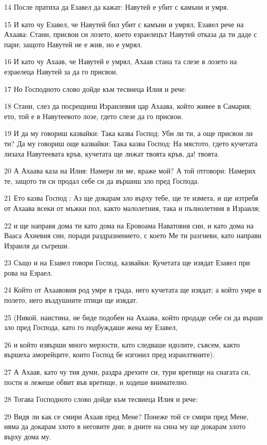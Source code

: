 \par 14 После пратиха да Езавел да кажат: Навутей е убит с камъни и умря.
\par 15 И като чу Езавел, че Навутей бил убит с камъни и умрял, Езавел рече на Ахаава: Стани, присвои си лозето, което езраелецът Навутей отказа да ти даде с пари; защото Навутей не е жив, но е умрял.
\par 16 И като чу Ахаав, че Навутей е умрял, Ахаав стана та слезе в лозето на езраелеца Навутей за да го присвои.
\par 17 Но Господното слово дойде към тесвиеца Илия и рече:
\par 18 Стани, слез да посрещнеш Израилевия цар Ахаава, който живее в Самария; ето, той е в Навутеевото лозе, гдето слезе да го присвои.
\par 19 И да му говориш казвайки: Така казва Господ: Уби ли ти, а още присвои ли ти? Да му говориш още казвайки: Така казва Господ: На мястото, гдето кучетата лизаха Навутеевата кръв, кучетата ще лижат твоята кръв, да! твоята.
\par 20 А Ахаава каза на Илия: Намери ли ме, враже мой? А той отговори: Намерих те, защото ти си продал себе си да вършиш зло пред Господа.
\par 21 Ето казва Господ : Аз ще докарам зло върху тебе, ще те измета, и ще изтребя от Ахаава всеки от мъжки пол, както малолетния, така и пълнолетния в Израиля;
\par 22 и ще направя дома ти като дома на Еровоама Наватовия син, и като дома на Вааса Ахиевия син, поради раздразнението, с което Ме ти разгневи, като направи Израиля да съгреши.
\par 23 Също и на Езавел говори Господ, казвайки: Кучетата ще изядат Езавел при рова на Езраел.
\par 24 Който от Ахаавовия род умре в града, него кучетата ще изядат; а който умре в полето, него въздушните птици ще изядат.
\par 25 (Никой, наистина, не биде подобен на Ахаава, който продаде себе си да върши зло пред Господа, като го подбуждаше жена му Езавел,
\par 26 и който извърши много мерзости, като следваше идолите, съвсем, както вършеха аморейците, които Господ бе изгонил пред израилтяните).
\par 27 А Ахаав, като чу тия думи, раздра дрехите си, тури вретище на снагата си, пости и лежеше обвит във вретище, и ходеше внимателно.
\par 28 Тогава Господното слово дойде към тесвиеца Илия и рече:
\par 29 Видя ли как се смири Ахаав пред Мене? Понеже той се смири пред Мене, няма да докарам злото в неговите дни; в дните на сина му ще докарам злото върху дома му.

